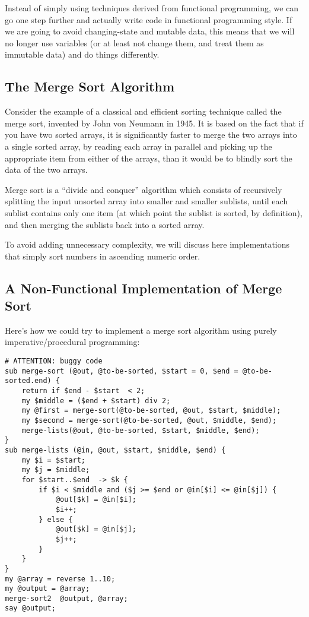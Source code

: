 Instead of simply using techniques derived from functional 
programming, we can go one step further and actually 
write code in functional programming style. If we are going 
to avoid changing-state and mutable data, this means that 
we will no longer use variables (or at least not change them, 
and treat them as immutable data) and do things differently.

\subsection{The Merge Sort Algorithm}
\label{mergesort}

Consider the example of a classical and efficient sorting 
technique called the merge sort, invented by John von Neumann 
in 1945. It is based on the fact that if you have two sorted 
arrays, it is significantly faster to merge the two arrays 
into a single sorted array, by reading each array in parallel and 
picking up the appropriate item from either of the arrays, than 
it would be to blindly sort the data of the two arrays.

Merge sort is a ``divide and conquer'' algorithm which 
consists of recursively splitting the input unsorted array into 
smaller and smaller sublists, until each sublist contains only 
one item (at which point the sublist is sorted, by definition), 
and then merging the sublists back into a sorted array.

To avoid adding unnecessary complexity, we will discuss here 
implementations that simply sort numbers in ascending numeric 
order.


\subsection{A Non-Functional Implementation of Merge Sort}

Here's how we could try to implement a merge sort algorithm using 
purely imperative/procedural programming:

\begin{verbatim}
# ATTENTION: buggy code
sub merge-sort (@out, @to-be-sorted, $start = 0, $end = @to-be-sorted.end) {
    return if $end - $start  < 2;
    my $middle = ($end + $start) div 2;
    my @first = merge-sort(@to-be-sorted, @out, $start, $middle);
    my $second = merge-sort(@to-be-sorted, @out, $middle, $end);
    merge-lists(@out, @to-be-sorted, $start, $middle, $end);
}
sub merge-lists (@in, @out, $start, $middle, $end) {
    my $i = $start;
    my $j = $middle;
    for $start..$end  -> $k {
        if $i < $middle and ($j >= $end or @in[$i] <= @in[$j]) {
            @out[$k] = @in[$i];
            $i++;
        } else {
            @out[$k] = @in[$j];
            $j++;
        } 
    }
}
my @array = reverse 1..10;
my @output = @array;
merge-sort2  @output, @array;
say @output;
\end{verbatim}

